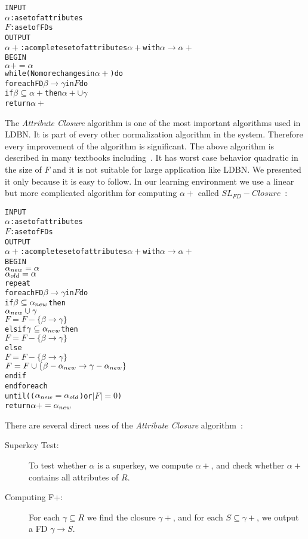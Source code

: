 \begin{alltt}
INPUT
  \(\alpha\)  : a set of attributes
  \(F\)  : a set of FDs
OUTPUT
  \(\alpha+\) : a complete set of attributes  \(\alpha+\)  with  \(\alpha \rightarrow \alpha+\)
BEGIN
  \(\alpha+ = \alpha\)
  while(No more changes in \(\alpha+\)) do
    foreach FD \(\beta \rightarrow \gamma\) in \(F\) do
      if \(\beta \subseteq \alpha+\) then \(\alpha+ \cup \gamma\)
    return \(\alpha+\)
\end{alltt} 

The \textit{Attribute Closure} algorithm is one of the most important algorithms used in LDBN. It is
part of every other normalization algorithm in the system. Therefore every improvement 
of the algorithm is significant. 
The above algorithm is described in many textbooks including~\cite{bdb1, bdb2, bdb4}.
It has worst case behavior quadratic in the size of $F$ and
it is not suitable for large application like LDBN. We presented it only because it is
easy to follow. In our learning environment we use a linear but more complicated algorithm for computing $\alpha+$ 
called $SL_{FD}-Closure$~\cite{p10}:

\begin{alltt}
INPUT
  \(\alpha\)  : a set of attributes
  \(F\)  : a set of FDs
OUTPUT
  \(\alpha+\) : a complete set of attributes  \(\alpha+\)  with  \(\alpha \rightarrow \alpha+\)
BEGIN
  \(\alpha\sb{new} = \alpha\)
  \(\alpha\sb{old} = \alpha\)
  repeat
    foreach FD \(\beta \rightarrow \gamma\) in \(F\) do
      if \(\beta \subseteq \alpha\sb{new}\) then 
        \(\alpha\sb{new} \cup \gamma\)
        \(F = F - \{\beta \rightarrow \gamma\}\) 
      elsif \(\gamma \subseteq \alpha\sb{new}\) then
        \(F = F - \{\beta \rightarrow \gamma\}\) 
      else
        \(F = F - \{\beta \rightarrow \gamma\}\) 
        \(F = F \cup \{\beta-\alpha\sb{new} \rightarrow \gamma-\alpha\sb{new}\}\) 
      end if
    end foreach 
  until ((\(\alpha\sb{new} = \alpha\sb{old}\)) or \(|F| = 0\))
  return \(\alpha+ = \alpha\sb{new}\)
\end{alltt} 

There are several direct uses of the \textit{Attribute Closure} algorithm~\cite{bdb4}:
\begin{description}
    \item[Superkey Test:] To test whether $\alpha$ is a superkey, we compute $\alpha+$, and check whether $\alpha+$ contains all attributes of $R$.
    \item[Computing F+:] For each $\gamma \subseteq R$ we find the closure $\gamma+$, and for each $S \subseteq \gamma+$, we output a FD $\gamma \rightarrow S$.
\end{description}

